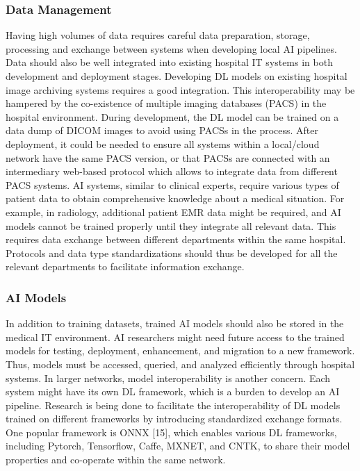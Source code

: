 \subsubsection{Data Management}
Having high volumes of data requires careful data preparation, storage, processing and exchange between systems when developing local AI pipelines. Data should also be well integrated into existing hospital IT systems in both development and deployment stages.
Developing DL models on existing hospital image archiving systems requires a good integration. This interoperability may be hampered by the co-existence of multiple imaging databases (PACS) in the hospital environment. During development, the DL model can be trained on a data dump of DICOM images to avoid using PACSs in the process. After deployment, it could be needed to ensure all systems within a local/cloud network have the same PACS version, or that PACSs are connected with an intermediary web-based protocol which allows to integrate data from different PACS systems. 
AI systems, similar to clinical experts, require various types of patient data to obtain comprehensive knowledge about a medical situation. For example, in radiology, additional patient EMR data might be required, and AI models cannot be trained properly until they integrate all relevant data. This requires data exchange between different departments within the same hospital. Protocols and data type standardizations should thus be developed for all the relevant departments to facilitate information exchange.\newline\subsubsection{AI Models}
In addition to training datasets, trained AI models should also be stored in the medical IT environment. AI researchers might need future access to the trained models for testing, deployment, enhancement, and migration to a new framework. Thus, models must be accessed, queried, and analyzed efficiently through hospital systems. In larger networks, model interoperability is another concern. Each system might have its own DL framework, which is a burden to develop an AI pipeline. Research is being done to facilitate the interoperability of DL models trained on different frameworks by introducing standardized exchange formats. One popular framework is ONNX [15], which enables various DL frameworks, including Pytorch, Tensorflow, Caffe, MXNET, and CNTK, to share their model properties and co-operate within the same network.


